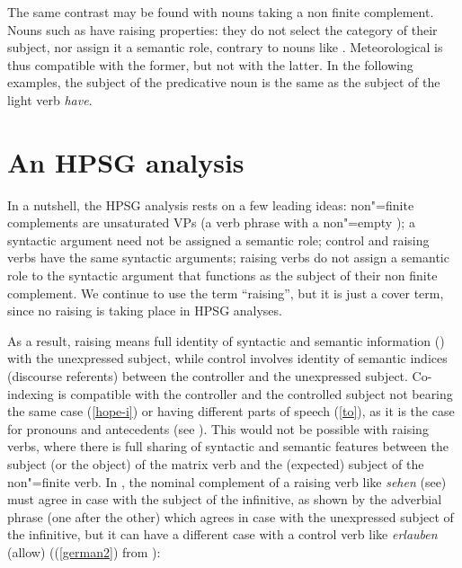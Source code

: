 \documentclass[output=paper
	        ,collection
	        ,collectionchapter
 	        ,biblatex
                ,babelshorthands
                ,newtxmath
                ,draftmode
                ,colorlinks, citecolor=brown
]{langscibook}
\begin{document}
\eal
{}
\zl

The same contrast may be found with  nouns taking a non finite complement. Nouns such as  have raising properties: they do not select the category of their subject, nor assign it a semantic role, contrary to nouns like . Meteorological  is thus compatible with the former, but not with the latter. In the following examples, the subject of the predicative noun is the same as the subject of the light verb \emph{have}.


\eal
{}
\zl

\section{An HPSG analysis}


In a nutshell, the HPSG analysis rests on a few leading ideas: non"=finite complements are unsaturated VPs (a verb phrase with a non"=empty \subjl); a syntactic argument need not be assigned a semantic role; control and raising verbs have the same syntactic arguments; raising verbs do not assign a semantic role to the syntactic argument that functions as the subject of their non finite complement. We continue to use the term ``raising'', but it is just a cover term, since no raising is taking place in HPSG analyses.

As a result,  raising means full identity of syntactic and semantic information ()  with the unexpressed subject, while control involves identity of semantic indices (discourse referents) between the controller and the unexpressed subject. Co-indexing is compatible with the controller and the controlled subject not bearing the same case (\ref{hope-i}) or having different parts of speech (\ref{to}), as it is the case for pronouns and antecedents (see ). This would not be possible with raising verbs, where there is full sharing of syntactic and semantic features between the subject (or the object) of the matrix verb and the (expected) subject of the non"=finite verb. In , the nominal complement of a raising verb like \emph{sehen} (see) must agree in case with the subject of the infinitive, as shown by the adverbial phrase (one after the other) which agrees in case with the unexpressed subject of the infinitive, but it can have a different case with a control verb like \emph{erlauben} (allow) ((\ref{german2}) from ):
\end{document}
